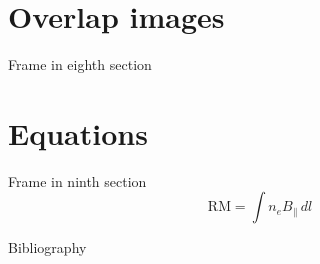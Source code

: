 \documentclass[xetex,aspectratio=169]{beamer}
\begin{document}
    \section{Overlap images}
    \begin{frame}{Frame in eighth section}
        \begin{center}
        \end{center} 
    \end{frame}

    \section{Equations}
    \begin{frame}{Frame in ninth section}
        \begin{equation}
            \text{RM} = \int n_e B_{\parallel}\,dl
        \end{equation}
    \end{frame}

    \begin{frame}[allowframebreaks]{Bibliography}
        \printbibliography
        \nocite{*}
    \end{frame}

    
\end{document}
